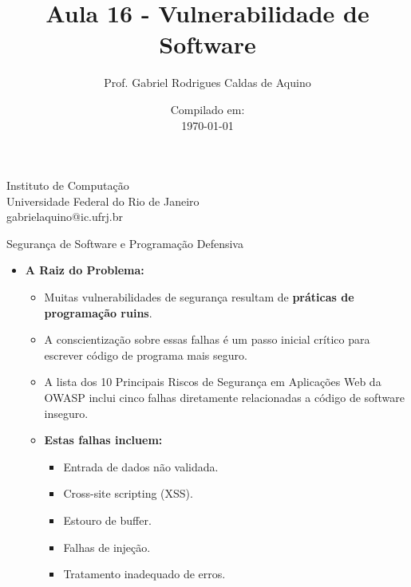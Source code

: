 \title{Aula 16 - Vulnerabilidade de Software}

\author{Prof. Gabriel Rodrigues Caldas de Aquino}

\institute
{
    Instituto de Computação \\
    Universidade Federal do Rio de Janeiro\\
    gabrielaquino@ic.ufrj.br%
}
\date{Compilado em: \\ \today} %




\begin{frame}
    \titlepage
\end{frame}


\begin{frame}{Segurança de Software e Programação Defensiva}
    \begin{itemize}
        \item \textbf{A Raiz do Problema:}
              \begin{itemize}
                  \item Muitas vulnerabilidades de segurança resultam de \textbf{práticas de programação ruins}.
                  \item A conscientização sobre essas falhas é um passo inicial crítico para escrever código de programa mais seguro.
                  \item A lista dos 10 Principais Riscos de Segurança em Aplicações Web da OWASP inclui cinco falhas diretamente relacionadas a código de software inseguro.

                  \item \textbf{Estas falhas incluem:}
                        \begin{itemize}
                            \item Entrada de dados não validada.
                            \item Cross-site scripting (XSS).
                            \item Estouro de buffer.
                            \item Falhas de injeção.
                            \item Tratamento inadequado de erros.
                        \end{itemize}
              \end{itemize}
    \end{itemize}
\end{frame}

